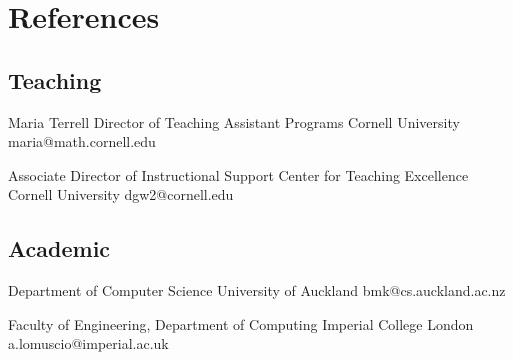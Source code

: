\documentclass[10pt,a4paper,sans]{moderncv}
\newif\ifref
\begin{document}


\ifref
\newpage
\section{References}

\subsection{Teaching}

{Maria Terrell}
{Director of Teaching Assistant Programs}
{Cornell University}
{}
{maria@math.cornell.edu}


{Associate Director of Instructional Support}
{Center for Teaching Excellence}
{Cornell University}
{dgw2@cornell.edu}

% 
% 

\subsection{Academic}


{Department of Computer Science}
{University of Auckland}
{}
{bmk@cs.auckland.ac.nz}

{Faculty of Engineering, 
Department of Computing}
{Imperial College London}
{}
{a.lomuscio@imperial.ac.uk}
\end{document}
